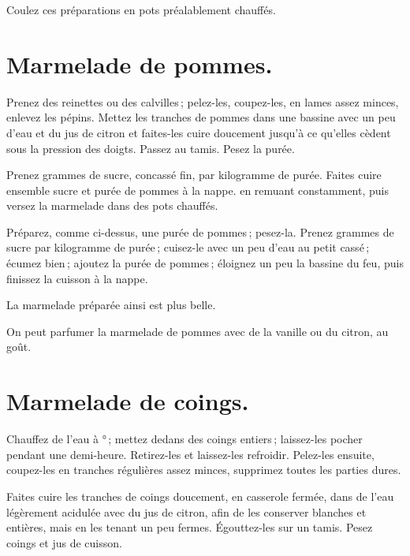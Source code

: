 Coulez ces préparations en pots préalablement chauffés.

\section*{\centering Marmelade de pommes.}
{}

Prenez des reinettes ou des calvilles ; pelez-les, coupez-les, en lames assez
minces, enlevez les pépins. Mettez les tranches de pommes dans une bassine avec
un peu d'eau et du jus de citron et faites-les cuire doucement jusqu'à ce
qu'elles cèdent sous la pression des doigts. Passez au tamis. Pesez la purée.

Prenez {\mmm} grammes de sucre, concassé fin, par kilogramme de purée.
Faites cuire ensemble sucre et purée de pommes à la nappe. en remuant
constamment, puis versez la marmelade dans des pots chauffés.

\sk

Préparez, comme ci-dessus, une purée de pommes ; pesez-la. Prenez {\mmm}
grammes de sucre par kilogramme de purée ; cuisez-le avec un peu d'eau au petit
cassé ; écumez bien ; ajoutez la purée de pommes ; éloignez un peu la bassine
du feu, puis finissez la cuisson à la nappe.

La marmelade préparée ainsi est plus belle.

\medskip

On peut parfumer la marmelade de pommes avec de la vanille ou du citron, au
goût.

\section*{\centering Marmelade de coings.}
{}

Chauffez de l'eau à {\mmm}° ; mettez dedans des coings entiers ;
laissez-les pocher pendant une demi-heure. Retirez-les et laissez-les
refroidir. Pelez-les ensuite, coupez-les en tranches régulières assez minces,
supprimez toutes les parties dures.

Faites cuire les tranches de coings doucement, en casserole fermée, dans de
l'eau légèrement acidulée avec du jus de citron, afin de les conserver blanches
et entières, mais en les tenant un peu fermes. Égouttez-les sur un tamis. Pesez
coings et jus de cuisson.

